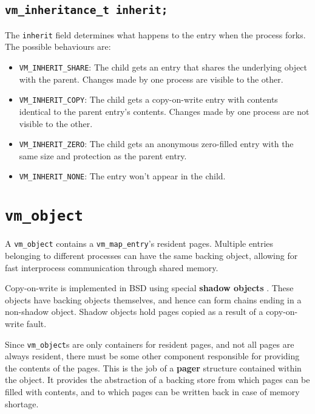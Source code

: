 \documentclass[shortabstract, english]{iithesis}
\begin{document}
\subsection*{\texttt{vm_inheritance_t inherit;}}
The \texttt{inherit} field determines what happens to the entry when the
process forks. The possible behaviours are:
\begin{itemize}
\item \texttt{VM_INHERIT_SHARE}: The child gets an entry that shares the
  underlying object with the parent. Changes made by one process are visible to
  the other.
\item \texttt{VM_INHERIT_COPY}: The child gets a copy-on-write entry with
  contents identical to the parent entry's contents. Changes made by one process
  are not visible to the other.
\item \texttt{VM_INHERIT_ZERO}: The child gets an anonymous zero-filled
  entry with the same size and protection as the parent entry.
\item \texttt{VM_INHERIT_NONE}: The entry won't appear in the child.
\end{itemize}

\section{\texttt{vm_object}}

A \texttt{vm_object} contains a \texttt{vm_map_entry}'s resident
pages. Multiple entries belonging to different processes can have the same
backing object, allowing for fast interprocess communication through shared
memory.

Copy-on-write is implemented in BSD using special \textbf{shadow objects}
\cite[Page~304]{bib:mckusick14}. These objects have backing objects themselves,
and hence can form chains ending in a non-shadow object. Shadow objects hold
pages copied as a result of a copy-on-write fault.

Since \texttt{vm_object}s are only containers for resident pages, and not
all pages are always resident, there must be some other component responsible
for providing the contents of the pages. This is the job of a \textbf{pager}
\cite[Section~6.10]{bib:mckusick14} structure contained within the object. It
provides the abstraction of a backing store from which pages can be filled with
contents, and to which pages can be written back in case of memory shortage.
\end{document}
